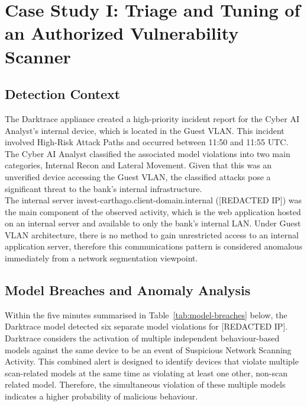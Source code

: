 \documentclass[12pt,a4paper]{report}
\begin{document}
\section{Case Study I: Triage and Tuning of an Authorized Vulnerability 
Scanner}
\subsection{Detection Context}
The Darktrace appliance created a high-priority incident report for the Cyber AI Analyst's internal device, which is located in the Guest VLAN. This incident involved High-Risk Attack Paths and occurred between 11:50 and 11:55 UTC. The Cyber AI Analyst classified the associated model violations into two main categories, Internal Recon and Lateral Movement. Given that this was an unverified device accessing the Guest VLAN, the classified attacks pose a significant threat to the bank's internal infrastructure.\\

The internal server invest-carthago.client-domain.internal ([REDACTED IP]) was the main component of the observed activity, which is the web application hosted on an internal server and available to only the bank's internal LAN. Under Guest VLAN architecture, there is no method to gain unrestricted access to an internal application server, therefore this communications pattern is considered anomalous immediately from a network segmentation viewpoint.

\subsection{Model Breaches and Anomaly Analysis}
Within the five minutes summarised in Table~\ref{tab:model-breaches} below, the Darktrace model detected six separate model violations for [REDACTED IP]. Darktrace considers the activation of multiple independent behaviour-based models against the same device to be an event of Suspicious Network Scanning Activity. This combined alert is designed to identify devices that violate multiple scan-related models at the same time as violating at least one other, non-scan related model. Therefore, the simultaneous violation of these multiple models indicates a higher probability of malicious behaviour.

\captionsetup{singlelinecheck=false, justification=raggedright}
\renewcommand{\arraystretch}{1.4}
\end{document}
